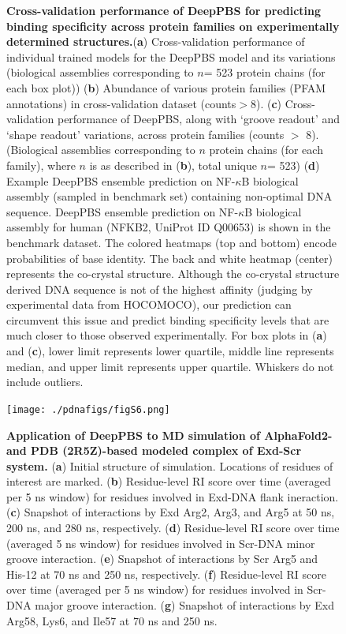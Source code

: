 \begin{center}
\begin{figure} [H]
  \caption[Cross-validation performance of DeepPBS for predicting binding specificity across protein families on experimentally determined structures.]{\textbf{Cross-validation performance of DeepPBS for predicting binding specificity across protein families on experimentally determined structures.}({\bf a}) Cross-validation performance of individual trained models for the DeepPBS model and its variations (biological assemblies corresponding to $n$= 523 protein chains (for each box plot)) ({\bf b}) Abundance of various protein families (PFAM annotations) in cross-validation dataset (counts$>$8). ({\bf c}) Cross-validation performance of DeepPBS, along with ‘groove readout’ and ‘shape readout’ variations, across protein families (counts $>$ 8). (Biological assemblies corresponding to $n$ protein chains (for each family), where $n$ is as described in ({\bf b}), total unique $n$= 523) ({\bf d}) Example DeepPBS ensemble prediction on NF-$\kappa$B biological assembly (sampled in benchmark set) containing non-optimal DNA sequence. DeepPBS ensemble prediction on NF-$\kappa$B biological assembly for human (NFKB2, UniProt ID Q00653) is shown in the benchmark dataset. The colored heatmaps (top and bottom) encode probabilities of base identity. The back and white heatmap (center) represents the co-crystal structure. Although the co-crystal structure derived DNA sequence is not of the highest affinity (judging by experimental data from HOCOMOCO), our prediction can circumvent this issue and predict binding specificity levels that are much closer to those observed experimentally. For box plots in ({\bf a}) and ({\bf c}), lower limit represents lower quartile, middle line represents median, and upper limit represents upper quartile. Whiskers do not include outliers.}
\end{figure}
\end{center}

\begin{center}
\begin{figure}[H]
  \texttt{[image: ./pdnafigs/figS6.png]}
    \caption[Application of DeepPBS to MD simulation of AlphaFold2- and PDB (2R5Z)-based modeled complex of Exd-
Scr system. ]{\textbf{Application of DeepPBS to MD simulation of AlphaFold2- and PDB (2R5Z)-based modeled complex of Exd-Scr system.} ({\bf a}) Initial structure of simulation. Locations of residues of interest are marked. ({\bf b}) Residue-level RI score over time (averaged per 5 ns window) for residues involved in Exd-DNA flank ineraction. ({\bf c}) Snapshot of interactions by Exd Arg2, Arg3, and Arg5 at 50 ns, 200 ns, and 280 ns, respectively. ({\bf d}) Residue-level RI score over time (averaged 5 ns window) for residues involved in Scr-DNA minor groove interaction. ({\bf e}) Snapshot of interactions by Scr Arg5 and His-12 at 70 ns and 250 ns, respectively. ({\bf f}) Residue-level RI score over time (averaged per 5 ns window) for residues involved in Scr-DNA major groove interaction. ({\bf g}) Snapshot of interactions by Exd Arg58, Lys6, and Ile57 at 70 ns and 250 ns.}
  \label{fig:pdnaS6}
\end{figure}
\end{center}


